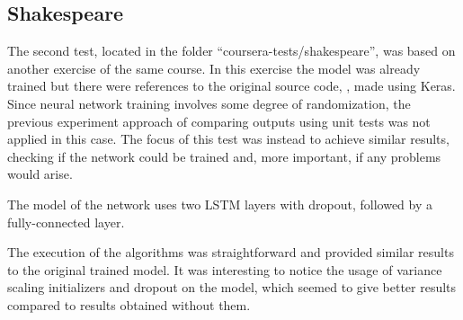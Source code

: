 \subsection{Shakespeare}

The second test, located in the folder ``coursera-tests/shakespeare'',  was based on another exercise of the same course. In this exercise the model was already trained but there were references to the original source code, 
, made using Keras. Since neural network training involves some degree of randomization, the previous experiment approach of comparing outputs using unit tests was not applied in this case. The focus of this test was instead to achieve similar results, checking if the network could be trained and, more important, if any problems would arise.

The model of the network uses two LSTM layers with dropout, followed by a fully-connected layer.

The execution of the algorithms was straightforward and provided similar results to the original trained model. It was interesting to notice the usage of variance scaling initializers and dropout on the model, which seemed to give better results compared to results obtained without them.
